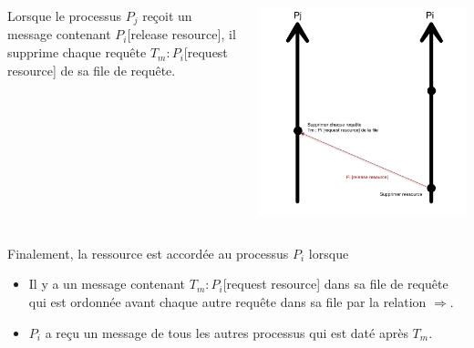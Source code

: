 \documentclass[compress]{beamer}
\begin{document}
\begin{frame}
\begin{columns}
    	\begin{column}{.65\textwidth}
			Lorsque le processus $P_j$ reçoit un message contenant $P_i$[release resource], il supprime chaque requête $T_m : P_i$[request resource] de sa file de requête.
		\end{column}
		\begin{column}{.35\textwidth}
			\includegraphics[scale=0.13]{process11.png}
		\end{column}
	\end{columns}
	Finalement, la ressource est accordée au processus $P_i$ lorsque
	\begin{itemize}
	\item Il y a un message contenant $T_m : P_i$[request resource] dans sa file de requête qui est ordonnée avant chaque autre requête dans sa file par la relation $\Rightarrow$.
	\item $P_i$ a reçu un message de tous les autres processus qui est daté après $T_m$.
	\end{itemize}
\end{frame}
\end{document}
